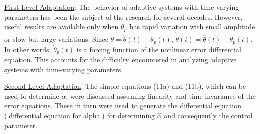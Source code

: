 \documentclass[conference]{IEEEtran}
\begin{document}
{\large \underline{First Level Adaptation}}: The behavior of adaptive systems with time-varying parameters has been the subject of the research for several decades. However, useful results are available only when $\theta_{p}$ has rapid variation with small amplitude or slow but large variations. Since $\tilde{\theta}=\hat{\theta}(t)-\theta_{p}(t)$, $\dot{\tilde{\theta}}(t)=\dot{\hat{\theta}}(t)-\dot{\theta}_{p}(t)$. In other words, $\dot{\theta}_{p}(t)$ is a forcing function of the nonlinear error differential equation. This accounts for the difficulty encountered in analyzing adaptive systems with time-varying parameters.

{\large \underline{Second Level Adaptation}}: The simple equations (11a) and (11b), which can be used to determine $\alpha$, were discussed assuming linearity and time-invariance of the error equations. These in turn were used to generate the differential equation (\ref{differential equation for alpha}) for determining $\hat{\alpha}$ and consequently the control parameter.
\end{document}
